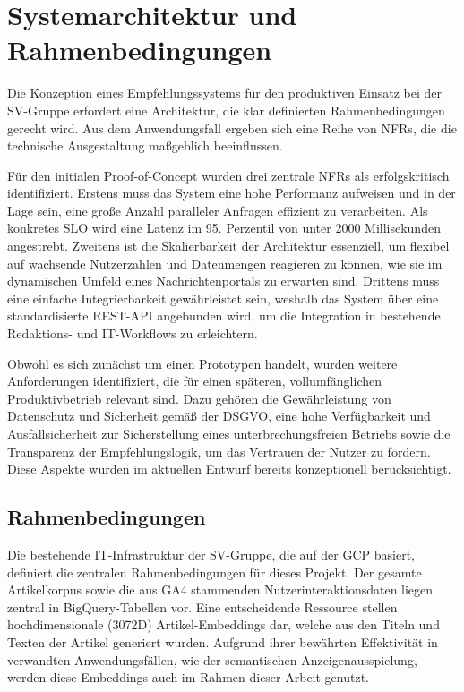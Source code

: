 \section{Systemarchitektur und Rahmenbedingungen}

Die Konzeption eines Empfehlungssystems für den produktiven Einsatz bei der SV-Gruppe erfordert eine Architektur, die klar definierten Rahmenbedingungen gerecht wird. 
Aus dem Anwendungsfall ergeben sich eine Reihe von \ac{NFR}s, die die technische Ausgestaltung maßgeblich beeinflussen.

\label{sec:nfr}
Für den initialen Proof-of-Concept wurden drei zentrale NFRs als erfolgskritisch identifiziert. 
Erstens muss das System eine hohe Performanz aufweisen und in der Lage sein, eine große Anzahl paralleler Anfragen effizient zu verarbeiten. 
Als konkretes \ac{SLO} wird eine Latenz im 95. Perzentil von unter 2000 Millisekunden angestrebt. 
Zweitens ist die Skalierbarkeit der Architektur essenziell, um flexibel auf wachsende Nutzerzahlen und Datenmengen reagieren zu können, 
wie sie im dynamischen Umfeld eines Nachrichtenportals zu erwarten sind. Drittens muss eine einfache Integrierbarkeit gewährleistet sein, 
weshalb das System über eine standardisierte REST-API angebunden wird, um die Integration in bestehende Redaktions- und IT-Workflows zu erleichtern.



Obwohl es sich zunächst um einen Prototypen handelt, wurden weitere Anforderungen identifiziert, die für einen späteren, 
vollumfänglichen Produktivbetrieb relevant sind. Dazu gehören die Gewährleistung von Datenschutz und Sicherheit gemäß der \ac{DSGVO}, 
eine hohe Verfügbarkeit und Ausfallsicherheit zur Sicherstellung eines unterbrechungsfreien Betriebs sowie die Transparenz der Empfehlungslogik, 
um das Vertrauen der Nutzer zu fördern. Diese Aspekte wurden im aktuellen Entwurf bereits konzeptionell berücksichtigt.

\subsection{Rahmenbedingungen}

Die bestehende IT-Infrastruktur der SV-Gruppe, die auf der \ac{GCP} basiert, definiert die zentralen Rahmenbedingungen für dieses Projekt. 
Der gesamte Artikelkorpus sowie die aus \ac{GA4} stammenden Nutzerinteraktionsdaten liegen zentral in BigQuery-Tabellen vor. 
Eine entscheidende Ressource stellen hochdimensionale (3072D) Artikel-Embeddings dar, 
welche aus den Titeln und Texten der Artikel generiert wurden. Aufgrund ihrer bewährten Effektivität in verwandten Anwendungsfällen, 
wie der semantischen Anzeigenausspielung, werden diese Embeddings auch im Rahmen dieser Arbeit genutzt.

